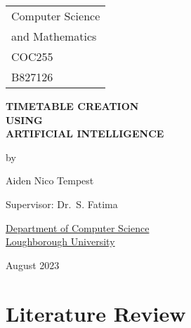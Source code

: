 \documentclass[a4paper, 12pt]{report}
\begin{document}

\thispagestyle{empty}

\fancypage{}{\fbox}

\begin{center}
    \Large{
        \hfill \begin{tabular}{l}
            Computer Science \\ and Mathematics \\
            COC255           \\
            B827126
        \end{tabular}
    }

    \vspace*{\fill}

    \Large{\textbf{TIMETABLE CREATION \\ USING \\
            ARTIFICIAL INTELLIGENCE}}

    \vspace*{\fill}

    by

    \vspace*{\fill}

    Aiden Nico Tempest

    \vspace*{\fill}
    Supervisor: Dr.\ S. Fatima
    \vspace*{\fill}

    \underline{Department of Computer Science} \\
    \underline{Loughborough University}

    \vspace*{\fill}
    August 2023

\end{center}


\newpage

\fancypage{}{}
\tableofcontents
\newpage
\chapter{Literature Review}
\end{document}
